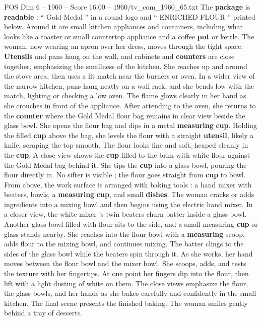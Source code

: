 \begin{textsample}{POS Dim 6 – 1960 – Score 16.00 – 1960/tv\_com\_1960\_65.txt}
The \textbf{package} is \textbf{readable} : “ Gold Medal ” in a round logo and “ ENRICHED FLOUR ” printed below.
Around it are small kitchen appliances and containers, including what looks like a toaster or small countertop appliance and a coffee \textbf{pot} or kettle.
The woman, now wearing an apron over her dress, moves through the tight space. \textbf{Utensils} and pans hang on the wall, and cabinets and \textbf{counters} are close together, emphasizing the smallness of the kitchen.
She reaches up and around the stove area, then uses a lit match near the burners or oven.
In a wider view of the narrow kitchen, pans hang neatly on a wall rack, and she bends low with the match, lighting or checking a low oven.
The flame glows clearly in her hand as she crouches in front of the appliance.
After attending to the oven, she returns to the \textbf{counter} where the Gold Medal flour bag remains in clear view beside the glass bowl.
She opens the flour bag and dips in a metal \textbf{measuring} \textbf{cup}.
Holding the filled \textbf{cup} above the bag, she levels the flour with a straight \textbf{utensil}, likely a knife, scraping the top smooth.
The flour looks fine and soft, heaped cleanly in the \textbf{cup}.
A close view shows the \textbf{cup} filled to the brim with white flour against the Gold Medal bag behind it.
She tips the \textbf{cup} into a glass bowl, pouring the flour directly in.
No sifter is visible ; the flour goes straight from \textbf{cup} to bowl.
From above, the work surface is arranged with baking tools : a hand mixer with beaters, bowls, a \textbf{measuring} \textbf{cup}, and small \textbf{dishes}.
The woman cracks or adds ingredients into a mixing bowl and then begins using the electric hand mixer.
In a closer view, the white mixer ’s twin beaters churn batter inside a glass bowl.
Another glass bowl filled with flour sits to the side, and a small measuring \textbf{cup} or glass stands nearby.
She reaches into the flour bowl with a \textbf{measuring} scoop, adds flour to the mixing bowl, and continues mixing.
The batter clings to the sides of the glass bowl while the beaters spin through it.
As she works, her hand moves between the flour bowl and the mixer bowl.
She scoops, adds, and tests the texture with her fingertips.
At one point her fingers dip into the flour, then lift with a light dusting of white on them.
The close views emphasize the flour, the glass bowls, and her hands as she bakes carefully and confidently in the small kitchen.
The final scene presents the finished baking.
The woman smiles gently behind a tray of desserts.

\end{textsample}
